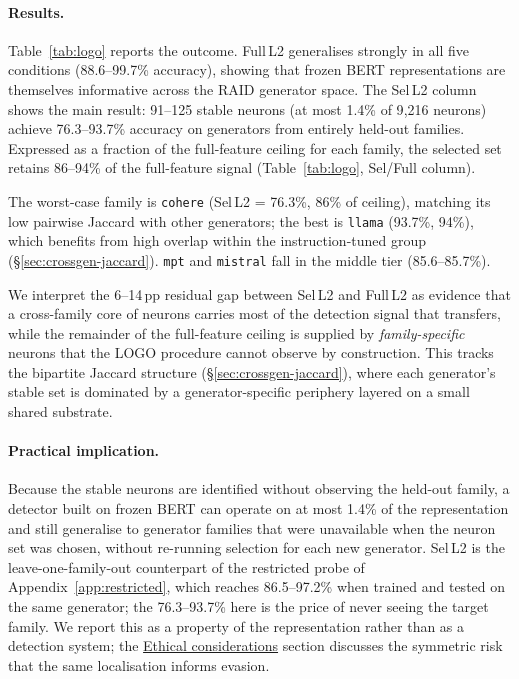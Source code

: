 \documentclass[11pt]{article}
\begin{document}
\paragraph{Results.}
Table~\ref{tab:logo} reports the outcome.
Full\,L2 generalises strongly in all five conditions (88.6--99.7\% accuracy),
showing that frozen BERT representations are themselves informative across
the RAID generator space. The Sel\,L2 column shows the main result:
91--125 stable neurons (at most 1.4\% of 9{,}216 neurons) achieve
76.3--93.7\% accuracy on generators from entirely held-out families.
Expressed as a fraction of the full-feature ceiling for each family,
the selected set retains 86--94\% of the full-feature signal (Table~\ref{tab:logo},
Sel/Full column).

The worst-case family is \texttt{cohere} (Sel\,L2 = 76.3\%, 86\% of ceiling), matching its low pairwise Jaccard with other generators; the best is \texttt{llama} (93.7\%, 94\%), which benefits from high overlap within the instruction-tuned group (§\ref{sec:crossgen-jaccard}). \texttt{mpt} and \texttt{mistral} fall in the middle tier (85.6--85.7\%).

We interpret the 6--14\,pp residual gap between Sel\,L2 and Full\,L2 as evidence that a cross-family core of neurons carries most of the detection signal that transfers, while the remainder of the full-feature ceiling is supplied by \textit{family-specific} neurons that the LOGO procedure cannot observe by construction. This tracks the bipartite Jaccard structure (§\ref{sec:crossgen-jaccard}), where each generator's stable set is dominated by a generator-specific periphery layered on a small shared substrate.

\paragraph{Practical implication.}
Because the stable neurons are identified without observing the held-out
family, a detector built on frozen BERT can operate on at most 1.4\% of the
representation and still generalise to generator families that were
unavailable when the neuron set was chosen, without re-running selection for
each new generator. Sel\,L2 is the leave-one-family-out counterpart of the
restricted probe of Appendix~\ref{app:restricted}, which reaches 86.5--97.2\%
when trained and tested on the same generator; the 76.3--93.7\% here is the
price of never seeing the target family. We report this as a property of the
representation rather than as a detection system; the
\hyperref[sec:ethics]{Ethical considerations} section discusses the symmetric
risk that the same localisation informs evasion.
\end{document}
